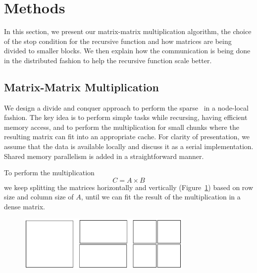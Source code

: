 \section{Methods}
\label{sec:methods}

In this section, we present our matrix-matrix multiplication algorithm, the choice of the stop condition for the recursive function and how matrices are being divided to smaller blocks. We then explain how the communication is being done in the distributed fashion to help the recursive function scale better.


\subsection{Matrix-Matrix Multiplication}
\label{sec:matmult}

We design a divide and conquer approach to perform the sparse \mm\ in a node-local fashion. The key idea is to perform simple tasks while recursing, having efficient memory access, and to perform the multiplication for small chunks where the resulting matrix can fit into an appropriate cache. For clarity of presentation, we assume that the data is available locally and discuss it as a serial implementation. Shared memory parallelism is added in a straightforward manner.

To perform the multiplication
\begin{equation}
    C = A \times B
\end{equation}
we keep splitting the matrices horizontally and vertically (Figure~\ref{fig:split2}) based on row size and column size of $A$, until we can fit the result of the multiplication in a dense matrix.

\begin{figure}[tbh]
 \centering
 \includegraphics[width=8.5cm,height=2.7cm]{./figures/split2.pdf}
 \caption{}
 \label{fig:split2}
 \Description{}
\end{figure}

